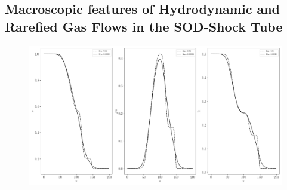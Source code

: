 \documentclass[12pt, a4paper]{article}
\begin{document}
\subsection{Macroscopic features of Hydrodynamic and Rarefied Gas Flows in the SOD-Shock Tube} \label{FeaturesSOD}
\begin{figure}[!htbp]
	\includegraphics[width=\textwidth]{Figures/Macroscopic_Quantities_Original.png}
\end{figure}
\end{document}

